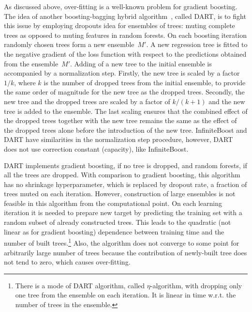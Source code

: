 As discussed above, over-fitting is a well-known problem for gradient boosting. 
The idea of another boosting-bagging hybrid algorithm~\cite{key-dart}, called DART, is to fight this issue by employing dropouts idea for ensembles of trees: muting complete trees as opposed to muting features in random forests. 
On each boosting iteration randomly chosen trees form a new ensemble~$M'$. 
A new regression tree is fitted to the negative gradient of the loss function with respect to the predictions obtained from the ensemble~$M'$.
Adding of a new tree to the initial ensemble is accompanied by a normalization step.
Firstly, the new tree is scaled by a factor $1/k$, where $k$ is the number of dropped trees from the initial ensemble, to provide the same order of magnitude for the new tree as the dropped trees. 
Secondly, the new tree and the dropped trees are scaled by a factor of $k/(k+1)$ and the new tree is added to the ensemble.
The last scaling ensures that the combined effect of the dropped trees together with the new tree remains the
same as the effect of the dropped trees alone before the introduction of the new tree.
InfiniteBoost and DART have similarities in the normalization step procedure, however, DART does not use correction constant (capacity), like InfiniteBoost.

DART implements gradient boosting, if no tree is dropped, and random forests, if all the trees are dropped.
With comparison to gradient boosting, this algorithm has no shrinkage hyperparameter, which is replaced by dropout rate, a fraction of trees muted on each iteration.
However, construction of large ensembles is not feasible in this algorithm from the computational point.
On each learning iteration it is needed to prepare new target by predicting the training set with a random subset of already constructed trees.
This leads to the quadratic (not linear as for gradient boosting) dependence between training time and the number of built trees.\footnote{
There is a mode of DART algorithm, called $\eta$-algorithm, with dropping only one tree from the ensemble on each iteration.
It is linear in time w.r.t. the number of trees in the ensemble.}
Also, the algorithm does not converge to some point for arbitrarily large number of trees because the contribution of newly-built tree does not tend to zero, which causes over-fitting.

